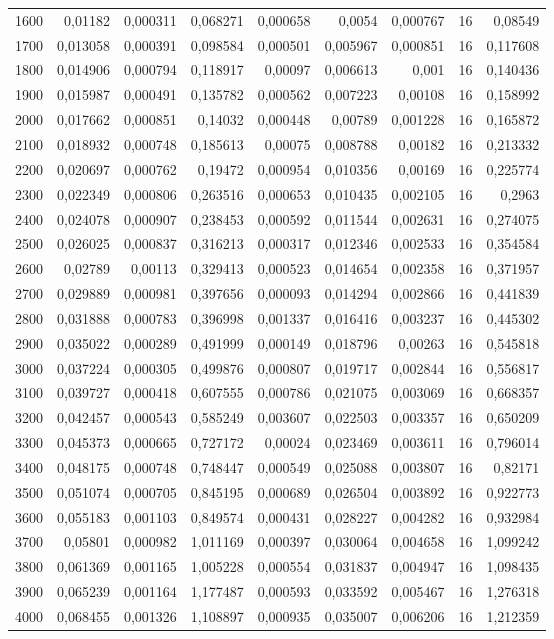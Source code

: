 \begin{tabular}{r r r r r r r r r}
1600 & 0,01182 & 0,000311 & 0,068271 & 0,000658 & 0,0054 & 0,000767 & 16 & 0,08549 \\
1700 & 0,013058 & 0,000391 & 0,098584 & 0,000501 & 0,005967 & 0,000851 & 16 & 0,117608 \\
1800 & 0,014906 & 0,000794 & 0,118917 & 0,00097 & 0,006613 & 0,001 & 16 & 0,140436 \\
1900 & 0,015987 & 0,000491 & 0,135782 & 0,000562 & 0,007223 & 0,00108 & 16 & 0,158992 \\
2000 & 0,017662 & 0,000851 & 0,14032 & 0,000448 & 0,00789 & 0,001228 & 16 & 0,165872 \\
2100 & 0,018932 & 0,000748 & 0,185613 & 0,00075 & 0,008788 & 0,00182 & 16 & 0,213332 \\
2200 & 0,020697 & 0,000762 & 0,19472 & 0,000954 & 0,010356 & 0,00169 & 16 & 0,225774 \\
2300 & 0,022349 & 0,000806 & 0,263516 & 0,000653 & 0,010435 & 0,002105 & 16 & 0,2963 \\
2400 & 0,024078 & 0,000907 & 0,238453 & 0,000592 & 0,011544 & 0,002631 & 16 & 0,274075 \\
2500 & 0,026025 & 0,000837 & 0,316213 & 0,000317 & 0,012346 & 0,002533 & 16 & 0,354584 \\
2600 & 0,02789 & 0,00113 & 0,329413 & 0,000523 & 0,014654 & 0,002358 & 16 & 0,371957 \\
2700 & 0,029889 & 0,000981 & 0,397656 & 0,000093 & 0,014294 & 0,002866 & 16 & 0,441839 \\
2800 & 0,031888 & 0,000783 & 0,396998 & 0,001337 & 0,016416 & 0,003237 & 16 & 0,445302 \\
2900 & 0,035022 & 0,000289 & 0,491999 & 0,000149 & 0,018796 & 0,00263 & 16 & 0,545818 \\
3000 & 0,037224 & 0,000305 & 0,499876 & 0,000807 & 0,019717 & 0,002844 & 16 & 0,556817 \\
3100 & 0,039727 & 0,000418 & 0,607555 & 0,000786 & 0,021075 & 0,003069 & 16 & 0,668357 \\
3200 & 0,042457 & 0,000543 & 0,585249 & 0,003607 & 0,022503 & 0,003357 & 16 & 0,650209 \\
3300 & 0,045373 & 0,000665 & 0,727172 & 0,00024 & 0,023469 & 0,003611 & 16 & 0,796014 \\
3400 & 0,048175 & 0,000748 & 0,748447 & 0,000549 & 0,025088 & 0,003807 & 16 & 0,82171 \\
3500 & 0,051074 & 0,000705 & 0,845195 & 0,000689 & 0,026504 & 0,003892 & 16 & 0,922773 \\
3600 & 0,055183 & 0,001103 & 0,849574 & 0,000431 & 0,028227 & 0,004282 & 16 & 0,932984 \\
3700 & 0,05801 & 0,000982 & 1,011169 & 0,000397 & 0,030064 & 0,004658 & 16 & 1,099242 \\
3800 & 0,061369 & 0,001165 & 1,005228 & 0,000554 & 0,031837 & 0,004947 & 16 & 1,098435 \\
3900 & 0,065239 & 0,001164 & 1,177487 & 0,000593 & 0,033592 & 0,005467 & 16 & 1,276318 \\
4000 & 0,068455 & 0,001326 & 1,108897 & 0,000935 & 0,035007 & 0,006206 & 16 & 1,212359 \\
\end{tabular}

